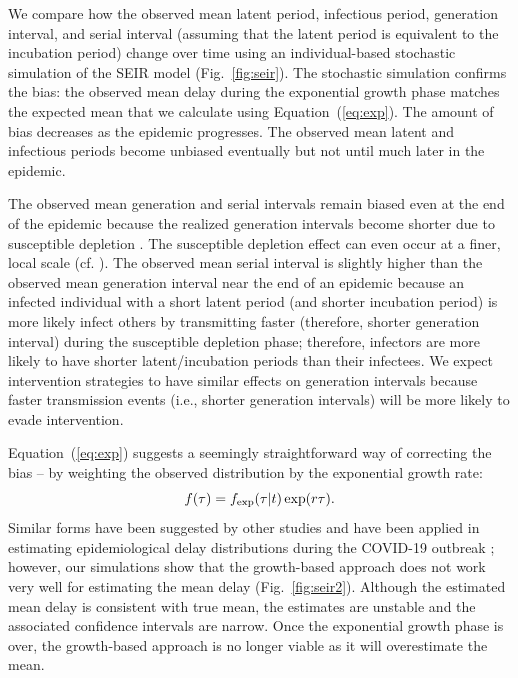 \documentclass[12pt]{article}
\newcommand{\eref}[1]{(\ref{eq:#1})}
\newcommand{\fref}[1]{Fig.~\ref{fig:#1}}
\begin{document}
We compare how the observed mean latent period, infectious period, generation interval, and serial interval (assuming that the latent period is equivalent to the incubation period) change over time using an individual-based stochastic simulation of the SEIR model (\fref{seir}).
The stochastic simulation confirms the bias: the observed mean delay during the exponential growth phase matches the expected mean that we calculate using Equation~\eref{exp}.
The amount of bias decreases as the epidemic progresses.
The observed mean latent and infectious periods become unbiased eventually but not until much later in the epidemic.

The observed mean generation and serial intervals remain biased even at the end of the epidemic because the realized generation intervals become shorter due to susceptible depletion \citep{champredon2015intrinsic}.
The susceptible depletion effect can even occur at a finer, local scale (cf. \cite{park2019inferring}).
The observed mean serial interval is slightly higher than the observed mean generation interval near the end of an epidemic because an infected individual with a short latent period (and shorter incubation period) is more likely infect others by transmitting faster (therefore, shorter generation interval) during the susceptible depletion phase; therefore, infectors are more likely to have shorter latent/incubation periods than their infectees.
We expect intervention strategies to have similar effects on generation intervals because faster transmission events (i.e., shorter generation intervals) will be more likely to evade intervention.

Equation~\eref{exp} suggests a seemingly straightforward way of correcting the bias -- by weighting the observed distribution by the exponential growth rate:
\begin{equation}
\label{eq:exp}
f(\tau) = f_{\tiny\textrm{exp}}(\tau|t) \exp(r \tau).
\end{equation}
Similar forms have been suggested by other studies \citep{britton2019estimation, park2019inferring} and have been applied in estimating epidemiological delay distributions during the COVID-19 outbreak \citep{nishiura2020serial, linton2020incubation};
however, our simulations show that the growth-based approach does not work very well for estimating the mean delay (\fref{seir2}).
Although the estimated mean delay is consistent with true mean, the estimates are unstable and the associated confidence intervals are narrow.
Once the exponential growth phase is over, the growth-based approach is no longer viable as it will overestimate the mean.
\end{document}
